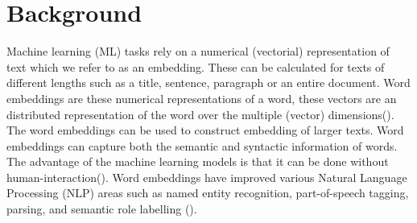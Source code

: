 \documentclass[../../Thesis.tex]{subfiles}
\begin{document}
\section{Background}
Machine learning (ML) tasks rely on a numerical (vectorial) representation of text which we refer to as an embedding. These can be calculated for texts of different lengths such as a title, sentence, paragraph or an entire document\cite{Karimi2017Deep}. Word embeddings are these numerical representations of a word, these vectors are an distributed representation of the word over the multiple (vector) dimensions(\citet{mikolov2013distributed}). The word embeddings can be used to construct embedding of larger texts. Word embeddings can capture both the semantic and syntactic information of words. The advantage of the machine learning models is that it can be done without human-interaction(\citet{lai2016generate}).
Word embeddings have improved various Natural Language Processing (NLP) areas such as named entity recognition, part-of-speech tagging, parsing, and semantic role labelling (\citet{luong2013better}).
\end{document}
